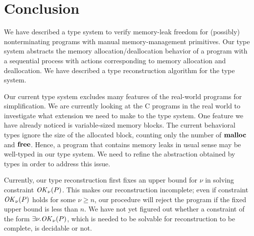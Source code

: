 \section{Conclusion}\label{sec:conclusion}

We have described a type system to verify memory-leak freedom for
(possibly) nonterminating programs with manual memory-management
primitives.  Our type system abstracts the memory
allocation/deallocation behavior of a program with a sequential
process with actions corresponding to memory allocation and
deallocation.  We have described a type reconstruction algorithm for
the type system.

Our current type system excludes many features of the real-world
programs for simplification.  We are currently looking at the C
programs in the real world to investigate what extension we need to
make to the type system.  One feature we have already noticed is
variable-sized memory blocks.  The current behavioral types ignore the
size of the allocated block, counting only the number of \(\mathbf{malloc}\)
and \(\mathbf{free}\).  Hence, a program that contains memory leaks in usual
sense may be well-typed in our type system.  We need to refine the
abstraction obtained by types in order to address this issue.

Currently, our type reconstruction first fixes an upper bound for
\(\nu\) in solving constraint \(\mathit{OK}_\nu(P)\).  This makes our
reconstruction incomplete; even if constraint \(\mathit{OK}_\nu(P)\) holds for
some \(\nu \ge n\), our procedure will reject the program if the fixed
upper bound is less than \(n\).  We have not yet figured out whether a
constraint of the form \(\exists \nu. \mathit{OK}_\nu(P)\), which is needed to
be solvable for reconstruction to be complete, is decidable or not.

